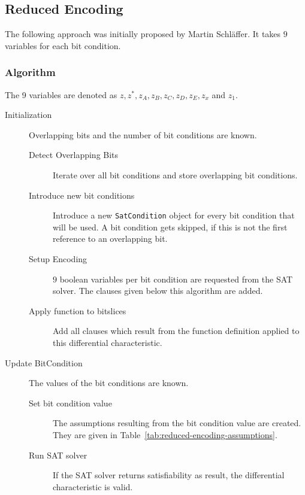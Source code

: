 \subsection{Reduced Encoding}
\label{sec:encoding:reduced-encoding}
%
The following approach was initially proposed by Martin Schläffer. It takes $9$ variables for each bit condition.

\subsubsection{Algorithm}
\label{sec:reduced-encoding-algorithm}
%
The 9 variables are denoted as $z, z^*, z_A, z_B, z_C, z_D, z_E, z_x$ and $z_1$.
%
\begin{description}
  \item[Initialization] Overlapping bits and the number of bit conditions are known.
    \begin{description}
      \item[Detect Overlapping Bits] Iterate over all bit conditions and store overlapping bit conditions.
      \item[Introduce new bit conditions] Introduce a new \texttt{SatCondition} object for every bit condition that will be used. A bit condition gets skipped, if this is not the first reference to an overlapping bit.
      \item[Setup Encoding] $9$ boolean variables per bit condition are requested from the SAT solver. The clauses given below this algorithm are added.
      \item[Apply function to bitslices] Add all clauses which result from the function definition applied to this differential characteristic.
    \end{description}
  \item[Update BitCondition] The values of the bit conditions are known.
    \begin{description}
      \item[Set bit condition value] The assumptions resulting from the bit condition value are created. They are given in Table~\ref{tab:reduced-encoding-assumptions}.
      \item[Run SAT solver] If the SAT solver returns satisfiability as result, the differential characteristic is valid.
    \end{description}
\end{description}

